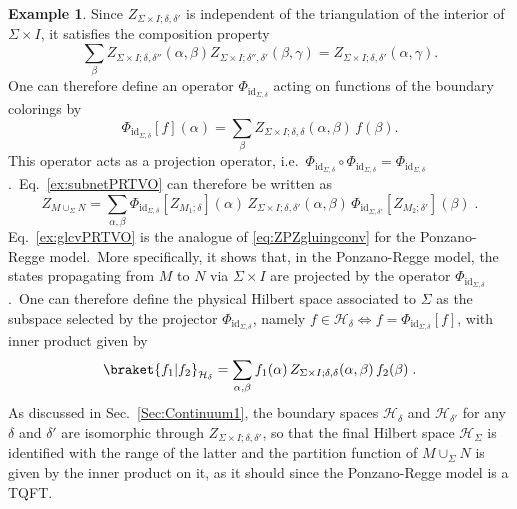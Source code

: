 \documentclass[11pt]{article}
\newcommand{\Hil}{\mathcal{H}}
\theoremstyle{definition}
\newtheorem{example}[proposition]{Example}
\numberwithin{equation}{section}
\begin{document}
\begin{example}
Since $Z_{\Sigma\times I;\delta,\delta'}$ is independent of the triangulation of the interior of $\Sigma\times I$, it satisfies the composition property
\begin{equation}
\sum_{\beta}
Z_{\Sigma\times I;\delta,\delta''}(\alpha,\beta)
Z_{\Sigma\times I;\delta'',\delta'}(\beta,\gamma)
=
Z_{\Sigma\times I;\delta,\delta'}(\alpha,\gamma).
\end{equation}
One can therefore define an operator $\Phi_{\mathrm{id}_{\Sigma,\delta}}$ acting on functions of the boundary colorings by
\begin{equation}
\Phi_{\mathrm{id}_{\Sigma,\delta}}[f](\alpha)
=
\sum_{\beta}
Z_{\Sigma\times I;\delta,\delta}(\alpha,\beta)\,f(\beta).
\end{equation}
This operator acts as a projection operator, i.e.~$\Phi_{\mathrm{id}_{\Sigma,\delta}}\circ \Phi_{\mathrm{id}_{\Sigma,\delta}}=\Phi_{\mathrm{id}_{\Sigma,\delta}}$.~Eq.~\eqref{ex:subnetPRTVO} can therefore be written as
\begin{equation}\label{ex:glcvPRTVO}
Z_{M \cup_{\Sigma} N}=
\sum_{\alpha,\beta}
\Phi_{\mathrm{id}_{\Sigma,\delta}}[Z_{M_1;\delta}](\alpha)\,
Z_{\Sigma\times I;\delta,\delta'}(\alpha,\beta)\,
\Phi_{\mathrm{id}_{\Sigma,\delta'}}[Z_{M_2;\delta'}](\beta)\;.
\end{equation}
Eq.~\eqref{ex:glcvPRTVO} is the analogue of \eqref{eq:ZPZgluingconv} for the Ponzano-Regge model.~More specifically, it shows that, in the Ponzano-Regge model, the states propagating from $M$ to $N$ via $\Sigma\times I$ are projected by the operator $\Phi_{\mathrm{id}_{\Sigma,\delta}}$.~One can therefore define the physical Hilbert space associated to $\Sigma$ as the subspace selected by the projector $\Phi_{\mathrm{id}_{\Sigma,\delta}}$, namely $f\in\Hil_{\delta} \Leftrightarrow f=\Phi_{\mathrm{id}_{\Sigma,\delta}}[f]$, with inner product given by
\begin{equation}
\braket{f_1|f_2}_{\Hil_{\delta}}=
\sum_{\alpha,\beta}
f_1(\alpha)\,
Z_{\Sigma\times I;\delta,\delta}(\alpha,\beta)\,
f_2(\beta)\;.
\end{equation}
As discussed in Sec.~\ref{Sec:Continuum1}, the boundary spaces $\Hil_{\delta}$ and $\Hil_{\delta'}$ for any $\delta$ and $\delta'$ are isomorphic through $Z_{\Sigma\times I;\delta,\delta'}$, so that the final Hilbert space $\Hil_{\Sigma}$ is identified with the range of the latter and the partition function of $M\cup_{\Sigma}N$ is given by the inner product on it, as it should since the Ponzano-Regge model is a TQFT.  
\end{example}
\end{document}
